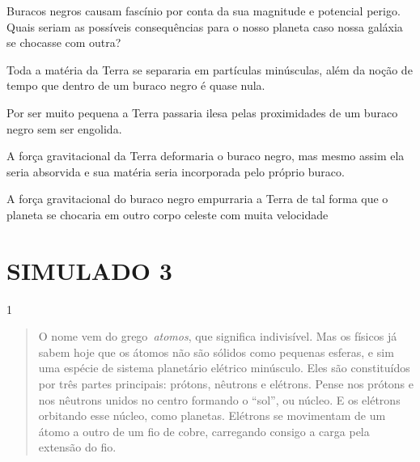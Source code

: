 Buracos negros causam fascínio por conta da sua magnitude e potencial
perigo. Quais seriam as possíveis consequências para o nosso planeta
caso nossa galáxia se chocasse com outra?

\begin{escolha}
\item
  Toda a matéria da Terra se separaria em partículas minúsculas, além da
  noção de tempo que dentro de um buraco negro é quase nula.
\item
  Por ser muito pequena a Terra passaria ilesa pelas proximidades de um
  buraco negro sem ser engolida.
\item
  A força gravitacional da Terra deformaria o buraco negro, mas mesmo
  assim ela seria absorvida e sua matéria seria incorporada pelo próprio
  buraco.
\item
  A força gravitacional do buraco negro empurraria a Terra de tal forma
  que o planeta se chocaria em outro corpo celeste com muita velocidade
\end{escolha}


\chapter{SIMULADO 3}

\num{1}
\begin{quote}
  O nome vem do grego~\emph{atomos}, que significa indivisível. Mas os
  físicos já sabem hoje que os átomos não são sólidos como pequenas
  esferas, e sim uma espécie de sistema planetário elétrico minúsculo.
  Eles são constituídos por três partes principais: prótons, nêutrons e
  elétrons. Pense nos prótons e nos nêutrons unidos no centro formando o
  ``sol'', ou núcleo. E os elétrons orbitando esse núcleo, como
  planetas. Elétrons se movimentam de um átomo a outro de um fio de
  cobre, carregando consigo a carga pela extensão do fio.

\end{quote}

